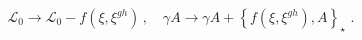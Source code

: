 \begin{equation}
{\mathcal{L}_{0}}\rightarrow {\mathcal{L}_{0}}-f(\xi ,\xi ^{gh})\,,\quad
\gamma A\rightarrow \gamma A+\left\{ f(\xi ,\xi ^{gh}),A\right\} _{\star
}\,\,.
\end{equation}%
